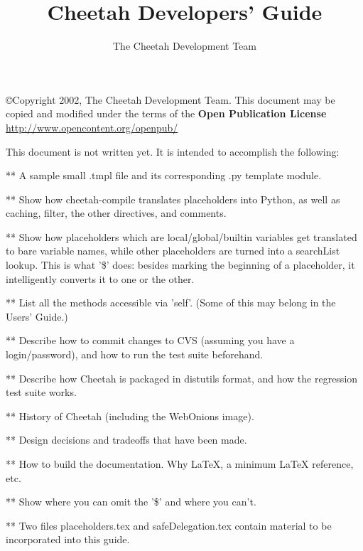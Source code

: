 \documentclass{howto}
\title{Cheetah Developers' Guide}
\author{The Cheetah Development Team}
\begin{document}
\maketitle



\copyright{Copyright 2002, The Cheetah Development Team.
      This document may be copied and modified under the terms of the
      {\bf Open Publication License} \url{http://www.opencontent.org/openpub/} }

This document is not written yet.  It is intended to accomplish the following:

** A sample small .tmpl file and its corresponding .py template module.

** Show how cheetah-compile translates placeholders into Python, as well as
caching, filter, the other directives, and comments.

** Show how placeholders which are local/global/builtin variables get
translated to bare variable names, while other placeholders are turned into a
searchList lookup.  This is what '\$' does: besides marking the beginning of a
placeholder, it intelligently converts it to one or the other.

** List all the methods accessible via 'self'.  (Some of this may belong in the
Users' Guide.)

** Describe how to commit changes to CVS (assuming you have a login/password),
and how to run the test suite beforehand.

** Describe how Cheetah is packaged in distutils format, and how the regression
test suite works.

** History of Cheetah (including the WebOnions image).

** Design decisions and tradeoffs that have been made.

** How to build the documentation.  Why LaTeX, a minimum LaTeX reference, etc.

** Show where you can omit the '\$' and where you can't.

** Two files placeholders.tex and safeDelegation.tex contain material to be
incorporated into this guide.

\end{document}
